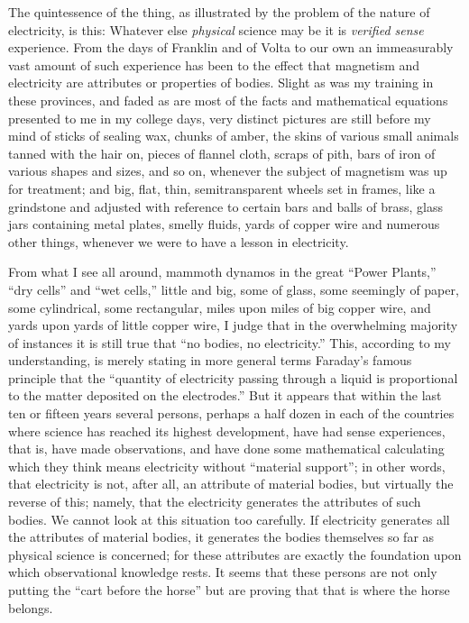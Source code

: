 \documentclass[a4paper, 11pt, oneside, polutonikogreek, english]{article}
\begin{document}
The quintessence of the thing, as illustrated by the problem of the nature of electricity, is this: Whatever else \emph{physical} science may be it is \emph{verified sense} experience. From the days of Franklin and of Volta to our own an immeasurably vast amount of such experience has been to the effect that magnetism and electricity are attributes or properties of bodies. Slight as was my training in these provinces, and faded as are most of the facts and mathematical equations presented to me in my college days, very distinct pictures are still before my mind of sticks of sealing wax, chunks of amber, the skins of various small animals tanned with the hair on, pieces of flannel cloth, scraps of pith, bars of iron of various shapes and sizes, and so on, whenever the subject of magnetism was up for treatment; and big, flat, thin, semitransparent wheels set in frames, like a grindstone and adjusted with reference to certain bars and balls of brass, glass jars containing metal plates, smelly fluids, yards of copper wire and numerous other things, whenever we were to have a lesson in electricity.

From what I see all around, mammoth dynamos in the great ``Power Plants,'' ``dry cells'' and ``wet cells,'' little and big, some of glass, some seemingly of paper, some cylindrical, some rectangular, miles upon miles of big copper wire, and yards upon yards of little copper wire, I judge that in the overwhelming majority of instances it is still true that ``no bodies, no electricity.'' This, according to my understanding, is merely stating in more general terms Faraday's famous principle that the ``quantity of electricity passing through a liquid is proportional to the matter deposited on the electrodes.'' But it appears that within the last ten or fifteen years several persons, perhaps a half dozen in each of the countries where science has reached its highest development, have had sense experiences, that is, have made observations, and have done some mathematical calculating which they think means electricity without ``material support''; in other words, that electricity is not, after all, an attribute of material bodies, but virtually the reverse of this; namely, that the electricity generates the attributes of such bodies. We cannot look at this situation too carefully. If electricity generates all the attributes of material bodies, it generates the bodies themselves so far as physical science is concerned; for these attributes are exactly the foundation upon which observational knowledge rests. It seems that these persons are not only putting the ``cart before the horse'' but are proving that that is where the horse belongs.
\end{document}
